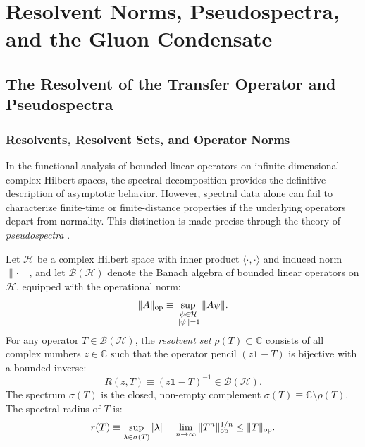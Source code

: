 \chapter{Resolvent Norms, Pseudospectra, and the Gluon Condensate}
\label{ch:resolvent}
\label{ch:resolvent_gluon_condensate}

\section{The Resolvent of the Transfer Operator and Pseudospectra}
\label{sec:resolvent_definition}

\subsection{Resolvents, Resolvent Sets, and Operator Norms}
\label{subsec:resolvents_general}

In the functional analysis of bounded linear operators on infinite-dimensional complex Hilbert spaces, the spectral decomposition provides the definitive description of asymptotic behavior. However, spectral data alone can fail to characterize finite-time or finite-distance properties if the underlying operators depart from normality. This distinction is made precise through the theory of \emph{pseudospectra} \cite{TrefethenEmbree2005}.

Let $\mathcal{H}$ be a complex Hilbert space with inner product $\langle \cdot, \cdot \rangle$ and induced norm $\|\cdot\|$, and let $\mathcal{B}(\mathcal{H})$ denote the Banach algebra of bounded linear operators on $\mathcal{H}$, equipped with the operational norm:
\begin{equation}
\label{eq:op_norm_def}
\|A\|_{\mathrm{op}} \equiv \sup_{\substack{\psi \in \mathcal{H} \\ \|\psi\| = 1}} \|A \psi\|.
\end{equation}
For any operator $T \in \mathcal{B}(\mathcal{H})$, the \emph{resolvent set} $\rho(T) \subset \mathbb{C}$ consists of all complex numbers $z \in \mathbb{C}$ such that the operator pencil $(z \mathbf{1} - T)$ is bijective with a bounded inverse:
\begin{equation}
\label{eq:resolvent_operator_def}
R(z, T) \equiv (z \mathbf{1} - T)^{-1} \in \mathcal{B}(\mathcal{H}).
\end{equation}
The spectrum $\sigma(T)$ is the closed, non-empty complement $\sigma(T) \equiv \mathbb{C} \setminus \rho(T)$. The spectral radius of $T$ is:
\begin{equation}
\label{eq:spectral_radius_def}
r(T) \equiv \sup_{\lambda \in \sigma(T)} |\lambda| = \lim_{n \to \infty} \|T^n\|_{\mathrm{op}}^{1/n} \le \|T\|_{\mathrm{op}}.
\end{equation}

